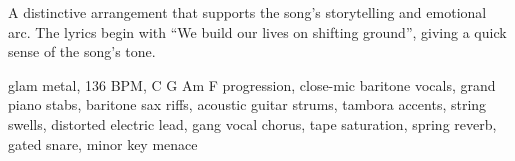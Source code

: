

\begin{notes}
A distinctive arrangement that supports the song's storytelling and emotional arc. %
The lyrics begin with “We build our lives on shifting ground”, giving a quick sense of the song’s tone.
\end{notes}

\begin{style}
glam metal, 136 BPM, C G Am F progression, close-mic baritone vocals, grand piano stabs, baritone sax riffs, acoustic guitar strums, tambora accents, string swells, distorted electric lead, gang vocal chorus, tape saturation, spring reverb, gated snare, minor key menace
\end{style}

